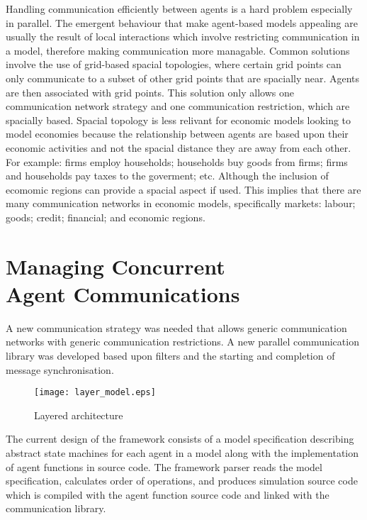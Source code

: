 \documentclass{aamas2009}
\begin{document}
Handling communication efficiently between agents is a hard problem especially
in parallel. The emergent behaviour that make agent-based models appealing are
usually the result of local interactions which involve restricting
communication in a model, therefore making communication more managable.
Common solutions involve the use of grid-based spacial topologies, where
certain grid points can only communicate to a subset of other grid points that
are spacially near. Agents are then associated with grid points.
This solution only allows one communication network strategy and one
communication restriction, which are spacially based.
Spacial topology is less relivant for economic models looking to model economies
because the relationship between agents are based upon their economic activities
and not the spacial distance they are away from each other. For example: firms
employ households; households buy goods from firms; firms and households pay
taxes to the goverment; etc. Although the inclusion of ecomomic regions can
provide a spacial aspect if used. This implies that there are many
communication networks in economic models, specifically markets: labour; goods;
credit; financial; and economic regions.

\section{Managing Concurrent\\Agent Communications}

A new communication strategy was needed that allows generic communication
networks with generic communication restrictions.
A new parallel communication library was developed based upon filters and the
starting and completion of message synchronisation.

\begin{figure}[hbp]
\centering
\texttt{[image: layer\_model.eps]}
\caption{Layered architecture}
\end{figure}

The current design of the framework consists of a model specification
describing abstract state machines for each agent in a model along with
the implementation of agent functions in source code. The framework parser reads
the model specification, calculates order of operations, and produces simulation
source code which is compiled with the agent function source code and linked
with the communication library.
\end{document}
